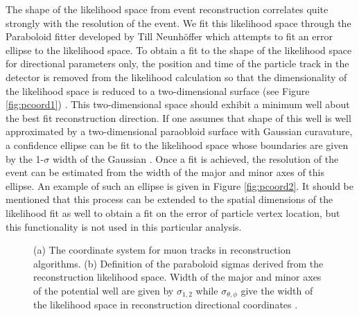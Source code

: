 \documentclass{gatech-thesis}
\begin{document}
The shape of the likelihood space from event reconstruction correlates quite strongly with the resolution of the event. We fit this likelihood space through the Paraboloid fitter developed by Till Neunh\"{o}ffer \cite{2006APh....25..220N} which attempts to fit an error ellipse to the likelihood space. To obtain a fit to the shape of the likelihood space for directional parameters only, the position and time of the particle track in the detector is removed from the likelihood calculation so that the dimensionality of the likelihood space is reduced to a two-dimensional surface (see Figure \ref{fig:pcoord1}) \cite{2006APh....25..220N}. This two-dimensional space should exhibit a minimum well about the best fit reconstruction direction. If one assumes that shape of this well is well approximated by a two-dimensional paraobloid surface with Gaussian curavature, a confidence ellipse can be fit to the likelihood space whose boundaries are given by the 1-$\sigma$ width of the Gaussian \cite{2006APh....25..220N}. Once a fit is achieved, the resolution of the event can be estimated from the width of the major and minor axes of this ellipse. An example of such an ellipse is given in Figure \ref{fig:pcoord2}. It should be mentioned that this process can be extended to the spatial dimensions of the likelihood fit as well to obtain a fit on the error of particle vertex location, but this functionality is not used in this particular analysis.
\begin{figure}
\centering
{}
\caption{(a) The coordinate system for muon tracks in reconstruction algorithms. (b) Definition of the paraboloid sigmas derived from the reconstruction likelihood space. Width of the major and minor axes of the potential well are given by $\sigma_{1,2}$ while $\sigma_{\theta , \phi}$ give the width of the likelihood space in reconstruction directional coordinates \cite{2006APh....25..220N}.}
\label{fig:ParaCoord}
\end{figure}
\end{document}
